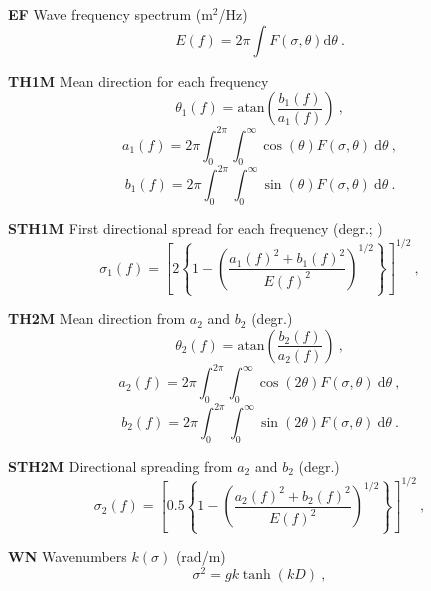 \begin{list}{)\hfill}
\begin{list}{)\hfill}
\item \textbf{EF} Wave frequency spectrum (m$^2$/Hz)
      \begin{equation} E(f) = 2 \pi  \int F(\sigma,\theta) \mathrm{d} \theta 
      \: . \label{eq:Ef} \end{equation}
\item \textbf{TH1M} Mean direction for each frequency  \citep[degr.;][]{art:KVH88}
       \begin{equation} \theta_1 (f)= \mbox{atan} \left ( \frac{b_1(f)}{a_1(f)} \right )
      \: , \label{eq:theta_b} \end{equation} \begin{equation}
      a_1(f) = 2 \pi \int_0^{2\pi} \int_0^\infty \cos(\theta) F(\sigma,\theta) \:
       \mathrm{d}\theta \: , \end{equation} \begin{equation}
      b_1(f) = 2 \pi \int_0^{2\pi} \int_0^\infty \sin(\theta) F(\sigma,\theta) \:
       \mathrm{d}\theta \: . \end{equation}
\item \textbf{STH1M} First directional spread for each frequency  (degr.; )
      \begin{equation} \sigma_1(f) = \left [ 2 \left \{ 1 - \left (
      \frac{a_1(f)^2+b_1(f)^2}{E(f)^2} \right )^{1/2} \right \} \right ]^{1/2}
      \: , \label{eq:sig_th1} \end{equation}
\item \textbf{TH2M} Mean direction from $a_2$ and $b_2$ (degr.)
       \begin{equation} \theta_2 (f)= \mbox{atan} \left ( \frac{b_2(f)}{a_2(f)} \right )
      \: , \label{eq:theta_2} \end{equation} \begin{equation}
      a_2(f) = 2 \pi \int_0^{2\pi} \int_0^\infty \cos(2 \theta) F(\sigma,\theta) \:
       \mathrm{d}\theta \: , \end{equation} \begin{equation}
      b_2(f) = 2 \pi \int_0^{2\pi} \int_0^\infty \sin(2 \theta) F(\sigma,\theta) \:
       \mathrm{d}\theta \: . \end{equation}
\item \textbf{STH2M} Directional spreading from $a_2$ and $b_2$ (degr.)  
      \begin{equation} \sigma_2(f) = \left [ 0.5 \left \{ 1 - \left (
      \frac{a_2(f)^2+b_2(f)^2}{E(f)^2} \right )^{1/2} \right \} \right ]^{1/2}
      \: , \label{eq:sig_th1} \end{equation}
\item \textbf{WN}  Wavenumbers $k(\sigma)$ (rad/m)
      \begin{equation} \sigma^2 = g k \tanh (k D) 
      \: , \label{eq:k} \end{equation}
\end{list}


\end{list}
